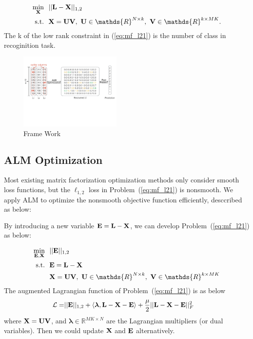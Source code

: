 \documentclass[letterpaper]{article}
\def\bE{{\bf E}}
\def\blambda{{\bm \lambda}}
\def\calL{{\mathcal{L}}}
\def\bL{{\bf L}}
\def\bU{{\bf U}}
\def\bV{{\bf V}}
\def\dsR{\mathds{R}}
\def\bX{{\bf X}}
\def\bX{{\bf X}}
\def\st{{\text{s.t.}}}
\begin{document}
\begin{align}\label{eq:mf_l21}
    \min_{\bX} ~&~ || \bL - \bX ||_{1,2}    \nonumber \\
    \st        ~&~ \bX = \bU \bV,~\bU \in \dsR^{N \times k},~\bV \in \dsR^{k \times MK} .
\end{align}
The k of the low rank constraint in (\ref{eq:mf_l21}) is the number of class in recoginition task.

\begin{figure}[h]
\centering\includegraphics[width=0.45\textwidth]{resource/frame_work.pdf}
\caption{Frame Work}
\label{fig:framework}
\end{figure}


\subsection{ALM Optimization}
Most existing matrix factorization optimization methods only consider smooth loss functions, but the $\ell_{1,2}$ loss in Problem~(\ref{eq:mf_l21}) is nonsmooth.
We apply ALM to optimize the nonsmooth objective function efficiently, desccribed as below:

By introducing a new variable $\bE = \bL - \bX$, we can develop Problem~(\ref{eq:mf_l21}) as below:

\begin{align}\label{eq:mf_l21_constrained}
  \min_{\bE, \bX} ~&~ || \bE ||_{1,2}   \nonumber \\
  \st             ~&~ \bE = \bL - \bX   \nonumber \\
                  ~&~ \bX = \bU \bV,~\bU \in \dsR^{N \times k},~\bV \in \dsR^{k \times MK}
\end{align}
The augmented Lagrangian function of Problem~(\ref{eq:mf_l21}) is as below
\begin{align}\label{eq:lagrangian_l21}
  \calL = & || \bE ||_{1,2} + \langle \blambda, \bL - \bX - \bE \rangle + \frac{\mu}{2} || \bL - \bX - \bE ||_F^2
\end{align}
\noindent
where $\bX = \bU \bV$,
and $\blambda \in \dsR^{MK \times N}$ are the Lagrangian multipliers (or dual variables).
Then we could update $\bX$ and $\bE$ alternatively.
\end{document}
